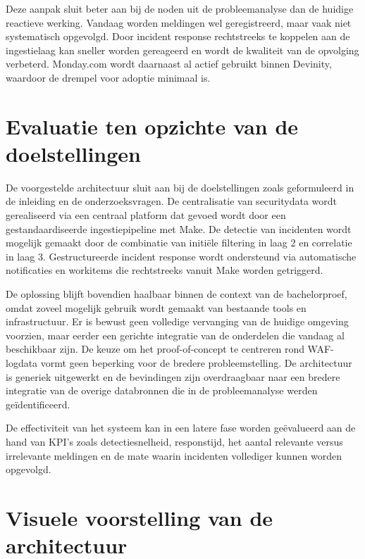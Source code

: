 Deze aanpak sluit beter aan bij de noden uit de probleemanalyse dan de huidige reactieve werking. Vandaag worden meldingen wel geregistreerd, maar vaak niet systematisch opgevolgd. Door incident response rechtstreeks te koppelen aan de ingestielaag kan sneller worden gereageerd en wordt de kwaliteit van de opvolging verbeterd. Monday.com wordt daarnaast al actief gebruikt binnen Devinity, waardoor de drempel voor adoptie minimaal is.


\section{Evaluatie ten opzichte van de doelstellingen}
De voorgestelde architectuur sluit aan bij de doelstellingen zoals geformuleerd in de inleiding en de onderzoeksvragen. De centralisatie van securitydata wordt gerealiseerd via een centraal platform dat gevoed wordt door een gestandaardiseerde ingestiepipeline met Make. De detectie van incidenten wordt mogelijk gemaakt door de combinatie van initiële filtering in laag 2 en correlatie in laag 3. Gestructureerde incident response wordt ondersteund via automatische notificaties en workitems die rechtstreeks vanuit Make worden getriggerd.

De oplossing blijft bovendien haalbaar binnen de context van de bachelorproef, omdat zoveel mogelijk gebruik wordt gemaakt van bestaande tools en infrastructuur. Er is bewust geen volledige vervanging van de huidige omgeving voorzien, maar eerder een gerichte integratie van de onderdelen die vandaag al beschikbaar zijn. De keuze om het proof-of-concept te centreren rond WAF-logdata vormt geen beperking voor de bredere probleemstelling. De architectuur is generiek uitgewerkt en de bevindingen zijn overdraagbaar naar een bredere integratie van de overige databronnen die in de probleemanalyse werden geïdentificeerd.

De effectiviteit van het systeem kan in een latere fase worden geëvalueerd aan de hand van KPI's zoals detectiesnelheid, responstijd, het aantal relevante versus irrelevante meldingen en de mate waarin incidenten vollediger kunnen worden opgevolgd.


\usetikzlibrary{positioning,fit}

\section{Visuele voorstelling van de architectuur}

